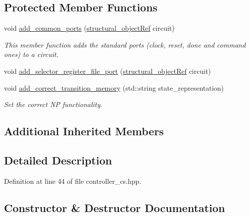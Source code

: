 \subsection*{Protected Member Functions}
\begin{DoxyCompactItemize}
\item 
void \hyperlink{classcontroller__cs_a8e36030a52dc30ae10633fc28a45a2bb}{add\+\_\+common\+\_\+ports} (\hyperlink{structural__objects_8hpp_a8ea5f8cc50ab8f4c31e2751074ff60b2}{structural\+\_\+object\+Ref} circuit)
\begin{DoxyCompactList}\small\item\em This member function adds the standard ports (clock, reset, done and command ones) to a circuit. \end{DoxyCompactList}\item 
void \hyperlink{classcontroller__cs_a2230a944eb2a06a9565aeec5c86c68e1}{add\+\_\+selector\+\_\+register\+\_\+file\+\_\+port} (\hyperlink{structural__objects_8hpp_a8ea5f8cc50ab8f4c31e2751074ff60b2}{structural\+\_\+object\+Ref} circuit)
\item 
void \hyperlink{classcontroller__cs_a4edfec7623dd2b6abd2be4a994fb19e2}{add\+\_\+correct\+\_\+transition\+\_\+memory} (std\+::string state\+\_\+representation)
\begin{DoxyCompactList}\small\item\em Set the correct NP functionality. \end{DoxyCompactList}\end{DoxyCompactItemize}
\subsection*{Additional Inherited Members}


\subsection{Detailed Description}


Definition at line 44 of file controller\+\_\+cs.\+hpp.



\subsection{Constructor \& Destructor Documentation}
\mbox{\label{classcontroller__cs_a54a2b1b31130cad07f1400b56db23e1b}} 
